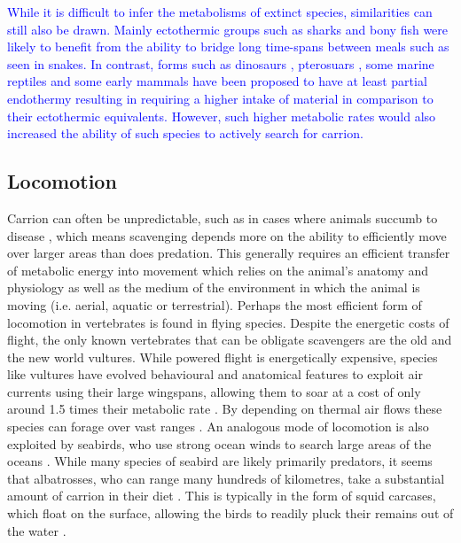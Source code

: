 \documentclass[a4paper,12pt]{article}
\begin{document}
\textcolor{blue}{While it is difficult to infer the metabolisms of extinct species, similarities can still also be drawn. Mainly ectothermic groups such as sharks and bony fish were likely to benefit from the ability to bridge long time-spans between meals such as seen in snakes. In contrast, forms such as dinosaurs \citep{grady2014evidence}, pterosuars \citep{wellnhofer1991illustrated}, some marine reptiles \citep{bernard2010regulation} and some early mammals \citep{lovegrove2016phenology} have been proposed to have at least partial endothermy resulting in requiring a higher intake of material in comparison to their ectothermic equivalents. However, such higher metabolic rates would also increased the ability of such species to actively search for carrion.}

\subsection{Locomotion}
Carrion can often be unpredictable, such as in cases where animals succumb to disease \citep{devault2003scavenging}, which means scavenging depends more on the ability to efficiently move over larger areas than does predation.
This generally requires an efficient transfer of metabolic energy into movement which relies on the animal's anatomy and physiology as well as the medium of the environment in which the animal is moving (i.e. aerial, aquatic or terrestrial).
Perhaps the most efficient form of locomotion in vertebrates is found in flying species. 
Despite the energetic costs of flight, the only known vertebrates that can be obligate scavengers are the old and the new world vultures. 
While powered flight is energetically expensive, species like vultures have evolved behavioural and anatomical features to exploit air currents using their large wingspans, allowing them to soar at a cost of only around 1.5 times their metabolic rate \citep{hedenstrom1993migration,duriez2014cheap}.
By depending on thermal air flows these species can forage over vast ranges \citep{spiegel2013factors}. 
An analogous mode of locomotion is also exploited by seabirds, who use strong ocean winds to search large areas of the oceans \citep{norberg2012vertebrate,thaxter2012seabird}. 
While many species of seabird are likely primarily predators, it seems that albatrosses, who can range many hundreds of kilometres, take a substantial amount of carrion in their diet \citep{croxall1994dead}. 
This is typically in the form of squid carcases, which float on the surface, allowing the birds to readily pluck their remains out of the water \citep{croxall1994dead}. 
\end{document}
